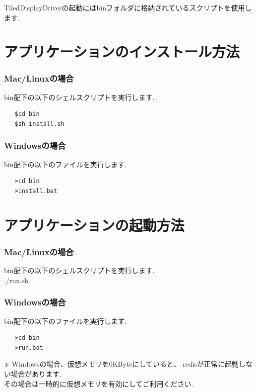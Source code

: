 \documentclass[a4paper,10pt,oneside]{jsbook}
\begin{document}
TiledDisplayDriverの起動にはbinフォルダに格納されているスクリプトを使用します.\\

\chapter{アプリケーションのインストール方法}

\subsection{Mac/Linuxの場合}
bin配下の以下のシェルスクリプトを実行します.\\

\begin{verbatim}
   $cd bin
   $sh install.sh
\end{verbatim}

\subsection{Windowsの場合}
bin配下の以下のファイルを実行します.\\
\begin{verbatim}
   >cd bin
   >install.bat
\end{verbatim}



\chapter{アプリケーションの起動方法}


\subsection{Mac/Linuxの場合}
bin配下の以下のシェルスクリプトを実行します.\\
./run.sh



\subsection{Windowsの場合}
bin配下の以下のファイルを実行します.\\
\begin{verbatim}
   >cd bin
   >run.bat
\end{verbatim}


※
Windowsの場合、仮想メモリを0KByteにしていると、
redisが正常に起動しない場合があります.\\
その場合は一時的に仮想メモリを有効にしてご利用ください.\\
\end{document}
